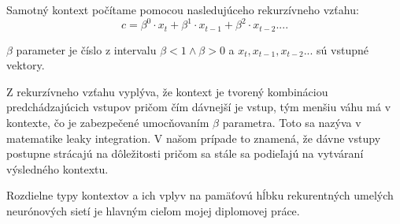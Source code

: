Samotný kontext počítame pomocou nasledujúceho rekurzívneho vzťahu:
\begin{equation}
	c = \beta^{0} \cdot x_{t} + \beta^{1} \cdot x_{t-1} + 
	\beta^{2} \cdot x_{t-2}....
\end{equation}

$\beta$ parameter je číslo z intervalu $\beta < 1 \wedge \beta > 0$ a
$x_t, x_{t-1}, x_{t-2} ...$ sú vstupné vektory.

Z rekurzívneho vzťahu vyplýva, že kontext je tvorený kombináciou predchádzajúcich vstupov
pričom čím dávnejší je vstup, tým menšiu váhu má v kontexte, čo je zabezpečené umocňovaním
$\beta$ parametra. Toto sa nazýva v matematike leaky integration. V našom prípade
to znamená, že dávne vstupy postupne strácajú na dôležitosti pričom sa stále sa podieľajú 
na vytváraní výsledného kontextu.


Rozdielne typy kontextov a ich vplyv na pamäťovú hĺbku rekurentných 
umelých neurónových sietí je hlavným cieľom mojej diplomovej práce.

